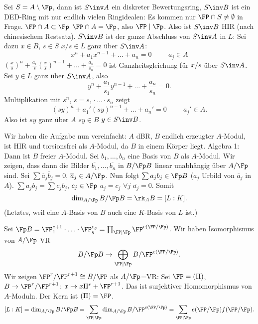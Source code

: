 \renewcommand{\lecdate}{10.12.2014}

\begin{Beweis}
 Sei $S=A\setminus \Fp$, dann ist $S\inv A$ ein diskreter Bewertungsring, $S\inv B$ ist ein DED-Ring mit nur endlich vielen Ringidealen: Es kommen nur $\FP\cap S\neq \emptyset$ in Frage. \folge $\FP\cap A\subset\Fp$ \folge $\FP\cap A=\Fp$, also $\FP\mid\Fp$. Also ist $S\inv B$ HIR (nach chinesischem Restsatz). $S\inv B$ ist der ganze Abschluss von $S\inv A$ in $L$: Sei dazu $x\in B$, $s\in S$ \folge $x/s\in L$ ganz über $S\inv A$: 
 \[ x^n+a_1x^{n-1}+\ldots +a_n=0\hspace{1cm} a_j\in A\]
 \folge $\left(\frac{x}{s}\right)^n+\frac{a_1}{s}\left(\frac{x}{s}\right)^{n-1}+\ldots+\frac{a_n}{s_n}=0$ ist Ganzheitsgleichung für $x/s$ über $S\inv A$. Sei $y\in L$ ganz über $S\inv A$, also
 \[ y^n+\frac{a_1}{s_1}y^{n-1}+\ldots+\frac{a_n}{s_n}=0.\]
 Multiplikation mit $s^n$, $s=s_1\cdot\ldots\cdot s_n$ zeigt
 \[ (sy)^n+a_1'(sy)^{n-1}+\ldots+a_n'=0\hspace{1cm} a_j'\in A.\]
 Also ist $sy$ ganz über $A$ \folge $sy\in B$ \folge $y\in S\inv B$.
 
 Wir haben die Aufgabe nun vereinfacht: $A$ dBR, $B$ endlich erzeugter $A$-Modul, ist HIR und torsionsfrei als $A$-Modul, da $B$ in einem Körper liegt. Algebra 1: Dann ist $B$ freier $A$-Modul. Sei $b_1,\ldots,b_n$ eine Basis von $B$ als $A$-Modul. Wir zeigen, dass dann die Bilder $\overline{b_1},\ldots,\overline{b_n}$ in $B/\Fp B$ linear unabhängig über $A/\Fp$ sind. Sei $\sum \overline{a}_j\overline{b}_j=0$, $\overline{a}_j\in A/\Fp$. Nun folgt $\sum a_j b_j\in\Fp B$ ($a_j$ Urbild von $\overline a_j$ in $A$). \folge $\sum a_jb_j=\sum c_j b_j$, $c_j\in\Fp$ \folge $a_j=c_j$ $\forall j$ \folge $\overline{a_j}=0$.
 Somit \[\dim_{A/\Fp} B/\Fp B=\rk_A B = [L:K]. \]
 (Letztes, weil eine $A$-Basis von $B$ auch eine $K$-Basis von $L$ ist.)
 
 Sei $\Fp B= \FP_1^{e+1}\cdot\ldots\cdot \FP_g^{e_g}=\prod_{\FP\mid \Fp} \FP^{e(\FP/\Fp)}$. Wir haben Isomorphismus von $A/\Fp$-VR \[ B/\Fp B \rightarrow \bigoplus_{\FP\mid \Fp} B/\FP^{e(\FP/\Fp)}.\]
 Wir zeigen $\FP^r/\FP^{r+1}\cong B/\FP$ als $A/\Fp$=VR: Sei $\FP=(\Pi)$, $B \rightarrow \FP^r/\FP^{r+1}$: $x\mapsto x\Pi^r+\FP^{r+1}$. Das ist surjektiver Homomorphismus von $A$-Moduln. Der Kern ist $(\Pi)=\FP$. 
 \[ [L:K]=\dim_{A/\Fp} B/\Fp B = \sum_{\FP\mid \Fp} \dim_{A/\Fp} B/\FP^{e(\FP/\Fp)}=\sum_{\FP\mid\Fp} e(\FP/\Fp) f(\FP/\Fp).\]
\end{Beweis}

